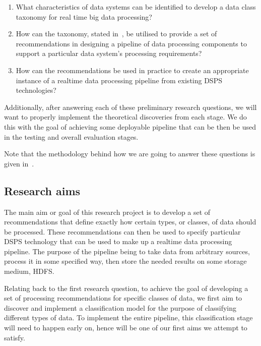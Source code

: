 \documentclass[a4paper,11pt]{article}
\begin{document}
\begin{enumerate}
  \item\label{item:taxonomy} What characteristics of data systems can be identified to develop a data class taxonomy
  for real time big data processing?
  \item\label{item:recommendations} How can the taxonomy, stated in~, be utilised to provide a set
  of recommendations in designing a pipeline of data processing components to support a particular data system's
  processing requirements?
  \item\label{item:pipeline} How can the recommendations be used in practice to create an appropriate instance of a realtime
  data processing pipeline from existing DSPS technologies?
\end{enumerate}

Additionally, after answering each of these preliminary research questions, we will want to properly implement the
theoretical discoveries from each stage. We do this with the goal of achieving some deployable pipeline that can be then
be used in the testing and overall evaluation stages.

Note that the methodology behind how we are going to answer these questions is given in~.



\subsection{Research aims} %
\label{sub:research_aims}

The main aim or goal of this research project is to develop a set of recommendations that define exactly how certain
types, or classes, of data should be processed. These recommendations can then be used to specify particular DSPS technology
that can be used to make up a realtime data processing pipeline. The purpose of the pipeline being to take data from
arbitrary sources, process it in some specified way, then store the needed results on some storage medium, \eg HDFS.

Relating back to the first research question, to achieve the goal of developing a set of processing recommendations for
specific classes of data, we first aim to discover and implement a classification model for the purpose of
classifying different types of data. To implement the entire pipeline, this classification stage will need to happen early
on, hence will be one of our first aims we attempt to satisfy.
\end{document}
